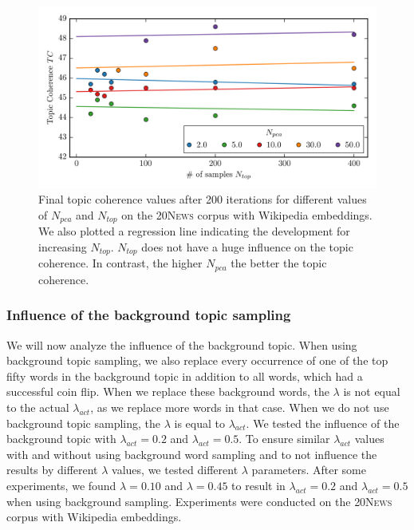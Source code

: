 \documentclass[
        a4paper,
        titlepage,
        twoside,
        parskip,
        numbers=noenddot
        ]{scrbook}
\theoremstyle{break}
\begin{document}
\begin{figure}
       \centering
       \includegraphics[width=\textwidth]{figures/welda_gaussian_pca_samples.png}
       \caption{Final topic coherence values after 200 iterations for different values of $N_{pca}$ and $N_{top}$ on the \textsc{20News} corpus with Wikipedia embeddings. We also plotted a regression line indicating the development for increasing $N_{top}$. $N_{top}$ does not have a huge influence on the topic coherence. In contrast, the higher $N_{pca}$ the better the topic coherence.}
       \label{fig:welda_gaussian_pca_samples}
\end{figure}

\subsubsection{Influence of the background topic sampling}

We will now analyze the influence of the background topic.
When using background topic sampling, we also replace every occurrence of one of the top fifty words in the background topic in addition to all words, which had a successful coin flip.
When we replace these background words, the $\lambda$ is not equal to the actual $\lambda_{act}$, as we replace more words in that case.
When we do not use background topic sampling, the $\lambda$ is equal to $\lambda_{act}$.
We tested the influence of the background topic with $\lambda_{act} = 0.2$ and $\lambda_{act} = 0.5$.
To ensure similar $\lambda_{act}$ values with and without using background word sampling and to not influence the results by different $\lambda$ values, we tested different $\lambda$ parameters.
After some experiments, we found $\lambda = 0.10$ and $\lambda = 0.45$ to result in $\lambda_{act} = 0.2$ and $\lambda_{act} = 0.5$ when using background sampling.
Experiments were conducted on the \textsc{20News} corpus with Wikipedia embeddings.
\end{document}

